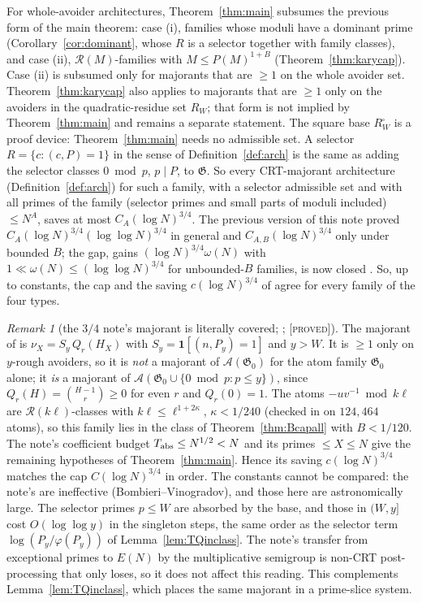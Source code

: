 \documentclass[10pt,reqno]{amsart}
\theoremstyle{definition}
\theoremstyle{remark}
\newtheorem{remark}[theorem]{Remark}
\newcommand{\A}{\mathcal A}
\newcommand{\cR}{\mathscr R}
\newcommand{\cG}{\mathfrak G}
\newcommand{\ind}{\mathbf 1}
\newcommand{\lab}[1]{\textup{[\textsc{#1}]}}
\begin{document}
For whole-avoider architectures, Theorem~\ref{thm:main} subsumes the
previous form of the main theorem: case (i), families whose moduli have
a dominant prime (Corollary~\ref{cor:dominant}, whose $R$ is a selector
together with family classes), and case (ii), $\cR(M)$-families with
$M\leq P(M)^{1+B}$ (Theorem~\ref{thm:karycap}).  Case (ii) is subsumed only
for majorants that are $\geq1$ on the whole avoider set.
Theorem~\ref{thm:karycap} also applies to majorants that are $\geq1$ only
on the avoiders in the quadratic-residue set $R_W$; that form is not
implied by Theorem~\ref{thm:main} and remains a separate statement.  The
square base $R_W^\square$ is a proof device: Theorem~\ref{thm:main} needs
no admissible set.  A selector $R=\{c:(c,P)=1\}$ in the sense of
Definition~\ref{def:arch} is the same as adding the selector classes
$0\bmod p$, $p\mid P$, to $\cG$.  So every CRT-majorant architecture
(Definition~\ref{def:arch}) for such a family, with a selector
admissible set and with all primes of the family (selector primes and
small parts of moduli included) $\leq N^A$, saves at most
$C_A(\log N)^{3/4}$.  The previous version of this note proved
$C_A(\log N)^{3/4}(\log\log N)^{3/4}$ in general and $C_{A,B}(\log N)^{3/4}$
only under bounded $B$; the gap, gains $(\log N)^{3/4}\omega(N)$ with
$1\ll\omega(N)\leq(\log\log N)^{3/4}$ for unbounded-$B$ families, is now closed
\cite[Cor.~4.2]{KA3}.  So, up to constants, the cap and the saving
$c(\log N)^{3/4}$ of \cite{TQ} agree for every family of the four types.

\begin{remark}[the $3/4$ note's majorant is literally covered; {\cite[Remark~5.4]{KA2}}; \lab{proved}]\label{rem:TQcovered}
The majorant of \cite{TQ} is $\nu_X=S_y\,Q_r(H_X)$ with
$S_y=\ind[(n,P_y)=1]$ and $y>W$.  It is $\geq1$ only on $y$-rough avoiders,
so it is \emph{not} a majorant of $\A(\cG_0)$ for the atom family $\cG_0$
alone; it \emph{is} a majorant of $\A(\cG_0\cup\{0\bmod p:p\leq y\})$, since
$Q_r(H)=\binom{H-1}r\geq0$ for even $r$ and $Q_r(0)=1$.  The atoms
$-uv^{-1}\bmod k\ell$ are $\cR(k\ell)$-classes with $k\ell\leq\ell^{1+2\kappa}$,
$\kappa<1/240$ (checked in \cite[check~(3)]{KA2rev2} on $124{,}464$ atoms), so
this family lies in the class of Theorem~\ref{thm:Bcapall} with $B<1/120$.
The note's coefficient budget $T_{\rm abs}\leq N^{1/2}<N$ and its primes
$\leq X\leq N$ give the remaining hypotheses of Theorem~\ref{thm:main}.
Hence its saving $c(\log N)^{3/4}$ matches the cap $C(\log N)^{3/4}$ in
order.  The constants cannot be compared: the note's are ineffective
(Bombieri--Vinogradov), and those here are astronomically large.  The
selector primes $p\leq W$ are absorbed by the base, and those in $(W,y]$
cost $O(\log\log y)$ in the singleton steps, the same order as the
selector term $\log(P_y/\varphi(P_y))$ of Lemma~\ref{lem:TQinclass}.  The
note's transfer from exceptional primes to $E(N)$ by the multiplicative
semigroup is non-CRT post-processing that only loses, so it does not
affect this reading.  This complements Lemma~\ref{lem:TQinclass}, which
places the same majorant in a prime-slice system.
\end{remark}
\end{document}
